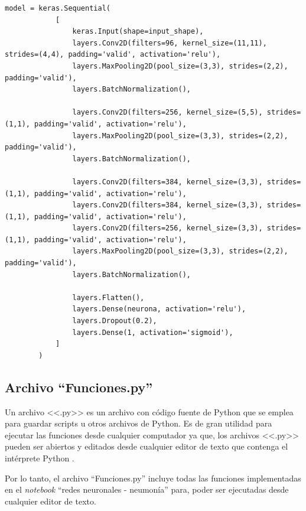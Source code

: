 \begin{lstlisting}[caption={Segmento de la función neuronas correspondiente al modelo Simple2}, label={lst:neuronas_simple2}]
model = keras.Sequential(
            [
                keras.Input(shape=input_shape),
                layers.Conv2D(filters=96, kernel_size=(11,11), strides=(4,4), padding='valid', activation='relu'),
                layers.MaxPooling2D(pool_size=(3,3), strides=(2,2), padding='valid'),
                layers.BatchNormalization(),
                
                layers.Conv2D(filters=256, kernel_size=(5,5), strides=(1,1), padding='valid', activation='relu'),
                layers.MaxPooling2D(pool_size=(3,3), strides=(2,2), padding='valid'),
                layers.BatchNormalization(),
                
                layers.Conv2D(filters=384, kernel_size=(3,3), strides=(1,1), padding='valid', activation='relu'),
                layers.Conv2D(filters=384, kernel_size=(3,3), strides=(1,1), padding='valid', activation='relu'),
                layers.Conv2D(filters=256, kernel_size=(3,3), strides=(1,1), padding='valid', activation='relu'),
                layers.MaxPooling2D(pool_size=(3,3), strides=(2,2), padding='valid'),
                layers.BatchNormalization(),
                
                layers.Flatten(), 
                layers.Dense(neurona, activation='relu'), 
                layers.Dropout(0.2),
                layers.Dense(1, activation='sigmoid'), 
            ]
        )

\end{lstlisting}

\subsection{Archivo ``Funciones.py''} 

Un archivo <<.py>> es un archivo con código fuente de Python que se emplea para guardar scripts u otros archivos de Python. Es de gran utilidad para ejecutar las funciones desde cualquier computador ya que, los archivos <<.py>> pueden ser abiertos y editados desde cualquier editor de texto que contenga el intérprete Python \cite{onlineconvert24}.

Por lo tanto, el archivo ``Funciones.py'' incluye todas las funciones implementadas en el \textit{notebook} ``redes neuronales - neumonía'' para, poder ser ejecutadas desde cualquier editor de texto.

